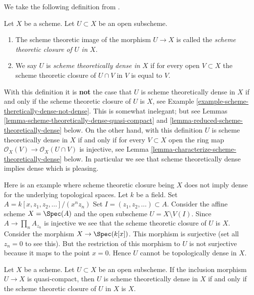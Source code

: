 \noindent
We take the following definition from \cite[IV, Definition 11.10.2]{EGA}.

\begin{definition}
\label{definition-scheme-theoretically-dense}
Let $X$ be a scheme. Let $U \subset X$ be an open subscheme.
\begin{enumerate}
\item The scheme theoretic image of the morphism $U \to X$
is called the {\it scheme theoretic closure of $U$ in $X$}.
\item We say $U$ is {\it scheme theoretically dense in $X$}
if for every open $V \subset X$ the scheme theoretic closure
of $U \cap V$ in $V$ is equal to $V$.
\end{enumerate}
\end{definition}

\noindent
With this definition it is
{\bf not} the case that $U$ is scheme theoretically dense in $X$ if and
only if the scheme theoretic closure of $U$ is $X$, see
Example \ref{example-scheme-theretically-dense-not-dense}.
This is somewhat inelegant; but see
Lemmas \ref{lemma-scheme-theoretically-dense-quasi-compact} and
\ref{lemma-reduced-scheme-theoretically-dense}
below. On the other hand, with this definition $U$ is scheme theoretically
dense in $X$ if and only if for every $V \subset X$ open the ring map
$\mathcal{O}_X(V) \to \mathcal{O}_X(U \cap V)$ is injective, see
Lemma \ref{lemma-characterize-scheme-theoretically-dense}
below. In particular we see that scheme theoretically dense implies dense
which is pleasing.

\begin{example}
\label{example-scheme-theretically-dense-not-dense}
Here is an example where scheme theoretic closure being $X$ does not
imply dense for the underlying topological spaces.
Let $k$ be a field.
Set $A = k[x, z_1, z_2, \ldots]/(x^n z_n)$
Set $I = (z_1, z_2, \ldots) \subset A$.
Consider the affine scheme $X = \Spec(A)$ and the
open subscheme $U = X \setminus V(I)$.
Since $A \to \prod_n A_{z_n}$ is injective we see that the scheme theoretic
closure of $U$ is $X$. Consider the morphism
$X \to \Spec(k[x])$. This morphism is surjective
(set all $z_n = 0$ to see this). But the restriction
of this morphism to $U$ is not surjective because it maps
to the point $x = 0$. Hence $U$ cannot be topologically dense
in $X$.
\end{example}

\begin{lemma}
\label{lemma-scheme-theoretically-dense-quasi-compact}
Let $X$ be a scheme.
Let $U \subset X$ be an open subscheme.
If the inclusion morphism $U \to X$ is quasi-compact, then $U$
is scheme theoretically dense in $X$ if and only if the scheme theoretic
closure of $U$ in $X$ is $X$.
\end{lemma}

